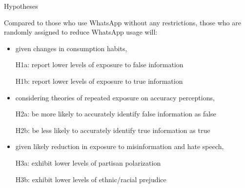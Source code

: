 \documentclass[usenames,dvipsnames,t]{beamer}
\begin{document}
\begin{frame}{Hypotheses} \small  

Compared to those who use WhatsApp without any restrictions, those who are randomly assigned to reduce WhatsApp usage will:	\pause

\vspace{.2cm}

\begin{itemize}
\item given changes in consumption habits, 
\end{itemize}
\vspace{-.2cm}
\begin{itemize}\setlength{\itemindent}{2em} \small
\item[H1a:] \color{yblue}  report lower levels of exposure to false information
\item[H1b:] \color{yblue}  report lower levels of exposure to true information
\end{itemize}	\pause

\begin{itemize}
\item considering theories of repeated exposure on accuracy perceptions, 
\end{itemize}
\vspace{-.2cm}
\begin{itemize}\setlength{\itemindent}{2em} \small
\item[H2a:] \color{yblue}  be more likely to accurately identify false information as false
\item[H2b:] \color{yblue}  be less likely to accurately identify true information as true
\end{itemize}	\pause

\begin{itemize}
\item given likely reduction in exposure to misinformation and hate speech,
\end{itemize}
\vspace{-.2cm}
\begin{itemize}\setlength{\itemindent}{2em} \small
\item[H3a:] \color{yblue}    exhibit lower levels of partisan polarization
\item[H3b:] \color{yblue}    exhibit lower levels of ethnic/racial prejudice
\end{itemize}



 


\end{frame}
\end{document}
